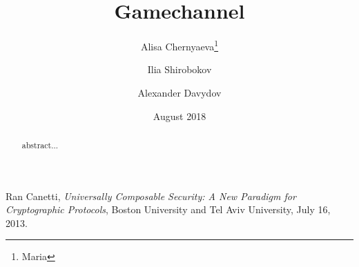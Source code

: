 \documentclass[tikz, 12pt]{article}
\title {Gamechannel}
\author {Alisa Chernyaeva\thanks{Maria}}
\author{Ilia Shirobokov\samethanks}
\author{  Alexander Davydov\samethanks}
\affil{Research department, DAO.Casino Company}
\affil{ \href{mailto:Research@Dao.casino}{Research@Dao.casino}}
\date {August 2018}
\theoremstyle{definition}
\theoremstyle{remark}
\begin{document}
\maketitle
	\begin{abstract}
abstract...
	\end{abstract}
\tableofcontents	
	
	
		


	\begin{thebibliography}{9}
Ran Canetti, \emph{Universally Composable Security: A New Paradigm for Cryptographic Protocols}, Boston University and Tel Aviv University, July 16, 2013.
\end{thebibliography}


		
\end{document}
